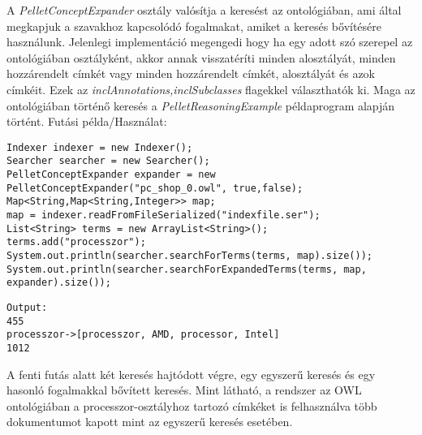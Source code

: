 A \emph{PelletConceptExpander} osztály valósítja a keresést az ontológiában, ami által megkapjuk a szavakhoz kapcsolódó fogalmakat, amiket a keresés bővítésére használunk. Jelenlegi implementáció megengedi hogy ha egy adott szó szerepel az ontológiában osztályként, akkor annak visszatéríti minden alosztályát, minden hozzárendelt címkét vagy minden hozzárendelt címkét, alosztályát és azok címkéit. Ezek az \emph{inclAnnotations,inclSubclasses} flagekkel választhatók ki. Maga az ontológiában történő keresés a \emph{PelletReasoningExample} példaprogram alapján történt.
Futási példa/Használat:
\begin{lstlisting}[frame=single,float=!ht]
Indexer indexer = new Indexer();
Searcher searcher = new Searcher();
PelletConceptExpander expander = new PelletConceptExpander("pc_shop_0.owl", true,false);
Map<String,Map<String,Integer>> map;
map = indexer.readFromFileSerialized("indexfile.ser");
List<String> terms = new ArrayList<String>();
terms.add("processzor");
System.out.println(searcher.searchForTerms(terms, map).size());
System.out.println(searcher.searchForExpandedTerms(terms, map, expander).size());
\end{lstlisting}
\begin{lstlisting}[frame=single,float=!ht]
Output:
455
processzor->[processzor, AMD, processor, Intel]
1012
\end{lstlisting}

A fenti futás alatt két keresés hajtódott végre, egy egyszerű keresés és egy hasonló fogalmakkal bővített keresés. Mint látható, a rendszer az OWL ontológiában a processzor-osztályhoz tartozó címkéket is felhasználva több dokumentumot kapott mint az egyszerű keresés esetében.